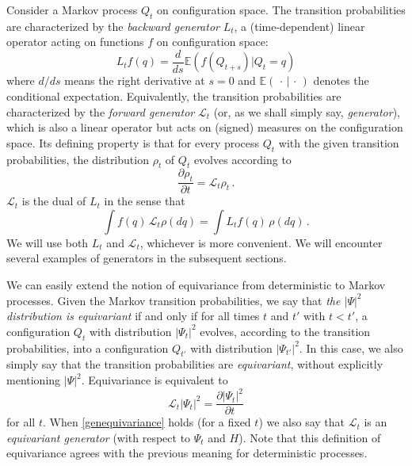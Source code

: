 \documentclass[12pt]{article}
\newcommand{\EEE}{\mathbb{E}} %
\newcommand{\1}{\mathbf{1}} %
\newcommand{\generator}{\mathscr{L}} %
\begin{document}
Consider a Markov process $Q_t$ on configuration space.  The
transition probabilities are characterized by the \emph{backward
generator} $L_t$, a (time-dependent) linear operator acting on
functions $f$ on configuration space:
\begin{equation}\label{backgenerator}
   L_t f(q) = \frac{d}{ds} \EEE (f(Q_{t+s})|Q_t = q)
\end{equation}
where $d/ds$ means the right derivative at $s=0$ and
$\EEE(\,\cdot\,|\,\cdot\,)$ denotes the conditional expectation.
Equivalently, the transition probabilities are characterized by the
\emph{forward generator} $\generator_t$ (or, as we shall simply say,
\emph{generator}), which is also a linear operator but acts on
(signed) measures on the configuration space.  Its defining property
is that for every process $Q_t$ with the given transition
probabilities, the distribution $\rho_t$ of $Q_t$ evolves according to
\begin{equation}\label{rhoL}
   \frac{\partial \rho_t}{\partial t} = \generator_t \rho_t\,.
\end{equation}
$\generator_t$ is the dual of $L_t$ in the sense that
\begin{equation}\label{generatorduality}
   \int f(q) \, \generator_t \rho(dq) = \int L_t f(q) \, \rho(dq)\,.
\end{equation}
We will use both $L_t$ and $\generator_t$, whichever is more
convenient.  We will encounter several examples of generators in the
subsequent sections.

We can easily extend the notion of equivariance from deterministic to
Markov processes. Given the Markov transition probabilities, we say that
\emph{the $|\Psi|^2$ distribution is equivariant} if and only if for all
times $t$ and $t'$ with $t<t'$, a configuration $Q_t$ with distribution
$|\Psi_t|^2$ evolves, according to the transition probabilities, into a
configuration $Q_{t'}$ with distribution $|\Psi_{t'}|^2$. In this case, 
we
also simply say  that the transition probabilities are
\emph{equivariant}, without explicitly mentioning $|\Psi|^2$. 
Equivariance
is equivalent to
\begin{equation}\label{genequivariance}
   \generator_t |\Psi_t|^2 = \frac{\partial |\Psi_t|^2}{\partial t}
\end{equation}
for all $t$. When \eqref{genequivariance} holds (for a fixed $t$) we
also say that $\generator_t$ is an \emph{equivariant generator} (with
respect to $\Psi_t$ and $H$). Note that this definition of
equivariance agrees with the previous meaning for deterministic
processes.
\end{document}
